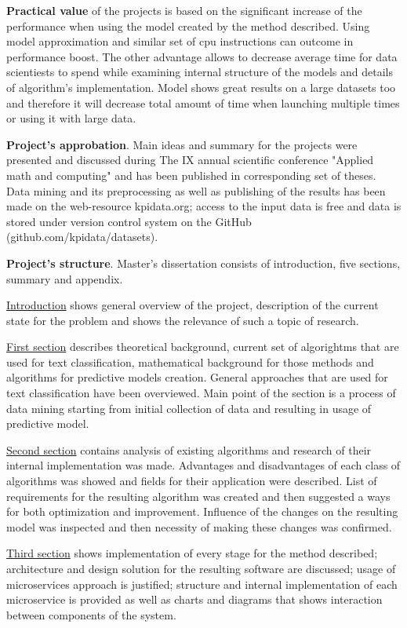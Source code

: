 \documentclass[a4paper,14pt]{extarticle}
\begin{document}
\textbf{Practical value} of the projects is based on the significant increase of the performance when using the model created by the method described. Using model approximation and similar set of cpu instructions can outcome in performance boost. The other advantage allows to decrease average time for data scientiests to spend while examining internal structure of the models and details of algorithm's implementation. Model shows great results on a large datasets too and therefore it will decrease total amount of time when launching multiple times or using it with large data.

\textbf{Project's approbation}. Main ideas and summary for the projects were presented and discussed during The IX annual scientific conference "Applied math and computing" and has been published in corresponding set of theses. Data mining and its preprocessing as well as publishing of the results has been made on the web-resource kpidata.org; access to the input data is free and data is stored under version control system on the GitHub (github.com/kpidata/datasets).

\textbf{Project's structure}. Master's dissertation consists of introduction, five sections, summary and appendix.

\underline{Introduction} shows general overview of the project, description of the current state for the problem and shows the relevance of such a topic of research. 

\underline{First section} describes theoretical background, current set of algorightms that are used for text classification, mathematical background for those methods and algorithms for predictive models creation. General approaches that are used for text classification have been overviewed. Main point of the section is a process of data mining starting from initial collection of data and resulting in usage of predictive model.

\underline{Second section} contains analysis of existing algorithms and research of their internal implementation was made. Advantages and disadvantages of each class of algorithms was showed and fields for their application were described. List of requirements for the resulting algorithm was created and then suggested a ways for both optimization and improvement. Influence of the changes on the resulting model was inspected and then necessity of making these changes was confirmed.

\underline{Third section} shows implementation of every stage for the method described; architecture and design solution for the resulting software are discussed; usage of microservices approach is justified; structure and internal implementation of each microservice is provided as well as charts and diagrams that shows interaction between components of the system.
\end{document}
